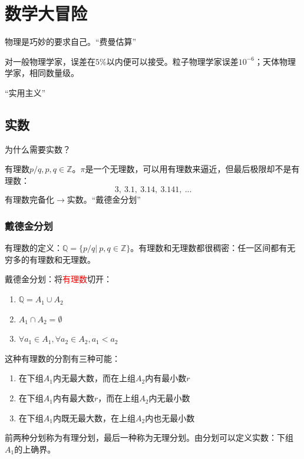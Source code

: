 % 
% 
\chapter{数学大冒险}
\label{Chap1}

物理是巧妙的要求自己。“费曼估算”

对一般物理学家，误差在$5\%$以内便可以接受。粒子物理学家误差$10^{-6}$；天体物理学家，相同数量级。

“实用主义”

\section{实数}
\label{ss}

为什么需要实数？

有理数$p/q, p,q\in \mathbb{Z}$。$\pi$是一个无理数，可以用有理数来逼近，但最后极限却不是有理数：
\[3,\ 3.1,\ 3.14,\ 3.141,\ ...\]
有理数完备化$\rightarrow$实数。“戴德金分划”

\subsection{戴德金分划}
\label{ddjfh}

有理数的定义：$\mathbb{Q} = \{p/q|\ p,q\in \mathbb{Z}\}$。有理数和无理数都很稠密：任一区间都有无穷多的有理数和无理数。

戴德金分划：将\textcolor{red}{有理数}切开：
\begin{enumerate}[fullwidth,itemindent=2em]
	\item $\mathbb{Q} = A_1\cup A_2$
	\item $A_1\cap A_2 = \emptyset$
	\item $\forall a_1\in A_1, \forall a_2\in A_2, a_1 < a_2$
\end{enumerate}

这种有理数的分割有三种可能：
\begin{enumerate}[fullwidth,itemindent=2em,label=(\arabic*)]
	\item 在下组$A_1$内无最大数，而在上组$A_2$内有最小数$r$
	\item 在下组$A_1$内有最大数$r$，而在上组$A_2$内无最小数
	\item 在下组$A_1$内既无最大数，在上组$A_2$内也无最小数
\end{enumerate}
前两种分划称为有理分划，最后一种称为无理分划。由分划可以定义实数：下组$A_1$的上确界。

